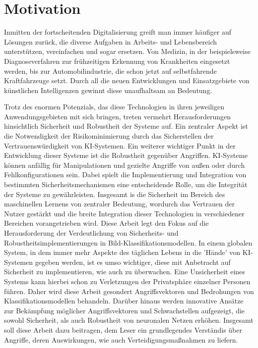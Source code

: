 \section{Motivation} \label{chpt:Einleitung_Motivation}

Inmitten der fortscheitenden Digitalisierung greift man immer häufiger auf Lösungen zurück, die diverse Aufgaben in Arbeits- und Lebensbereich unterstützen, vereinfachen und sogar ersetzen. Von Medizin, in der beispielsweise Diagnoseverfahren zur frühzeitigen Erkennung von Krankheiten eingesetzt werden, bis zur Automobilindustrie, die schon jetzt auf selbstfahrende Kraftfahrzeuge setzt. Durch all die neuen Entwicklungen und Einsatzgebiete von künstlichen Intelligenzen gewinnt diese unaufhaltsam an Bedeutung.

Trotz des enormen Potenzials, das diese Technologien in ihren jeweiligen Anwendungsgebieten mit sich bringen, treten vermehrt Herausforderungen hinsichtlich Sicherheit und Robustheit der Systeme auf. Ein zentraler Aspekt ist die Notwendigkeit der Risikominimierung durch das Sicherstellen der Vertrauenswürdigkeit von KI-Systemen.
Ein weiterer wichtiger Punkt in der Entwicklung dieser Systeme ist die Robustheit gegenüber Angriffen. KI-Systeme können anfällig für Manipulationen und gezielte Angriffe von außen oder durch Fehlkonfigurationen sein. Dabei spielt die Implementierung und Integration von bestimmten Sicherheitsmechanismen eine entscheidende Rolle, um die Integrität der Systeme zu gewährleisten.
Insgesamt is die Sicherheit im Bereich des maschinellen Lernens von zentraler Bedeutung, wordurch das Vertrauen der Nutzer gestärkt und die breite Integration dieser Technologien in verschiedener Bereichen vorangetrieben wird.
Diese Arbeit legt den Fokus auf die Herausforderung der Verdeutlichung  von Sicherheits- und Robustheitsimplementierungen in Bild-Klassifikationsmodellen. In einem globalen System, in dem immer mehr Aspekte des täglichen Lebens in die 'Hände' von KI-Systemen gegeben werden, ist es umso wichtiger, diese mit Anbetracht auf Sicherheit zu implementieren, wie auch zu überwachen. Eine Unsicherheit eines Systems kann hierbei schon zu Verletzungen der Privatsphäre einzelner Personen führen. Daher wird diese Arbeit gesondert  Angriffsvektoren und Bedrohungen von Klassifikationsmodellen behandeln.
Darüber hinaus werden innovative Ansätze zur Bekämpfung möglicher Angriffsvektoren und Schwachstellen aufgezeigt, die sowohl Sicherheit, als auch Robustheit von neuronalen Netzen erhöhen. Insgesamt soll diese Arbeit dazu beitragen, dem Leser ein grundlegendes Verständis über Angriffe, deren Auswirkungen, wie auch Verteidigungsmaßnahmen zu liefern. 

